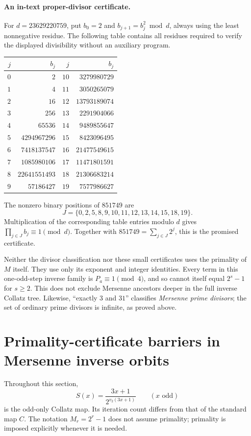 \documentclass[11pt,a4paper]{article}
\theoremstyle{definition}
\theoremstyle{remark}
\numberwithin{equation}{section}
\begin{document}
\paragraph{An in-text proper-divisor certificate.}
For $d=23629220759$, put $b_0=2$ and
$b_{j+1}=b_j^2\bmod d$, always using the least nonnegative residue.
The following table contains all residues required to verify the
displayed divisibility without an auxiliary program.
\begin{center}\small
\begin{tabular}{rrrr}
\toprule
$j$ & $b_j$ & $j$ & $b_j$\\\midrule
$0$&$2$&$10$&$3279980729$\\
$1$&$4$&$11$&$3050265079$\\
$2$&$16$&$12$&$13793189074$\\
$3$&$256$&$13$&$2291904066$\\
$4$&$65536$&$14$&$9489855647$\\
$5$&$4294967296$&$15$&$8423096495$\\
$6$&$7418137547$&$16$&$21477549615$\\
$7$&$1085980106$&$17$&$11471801591$\\
$8$&$22641551493$&$18$&$21306683214$\\
$9$&$57186427$&$19$&$7577986627$\\
\bottomrule
\end{tabular}
\end{center}
The nonzero binary positions of $851749$ are
\[
 J=\{0,2,5,8,9,10,11,12,13,14,15,18,19\}.
\]
Multiplication of the corresponding table entries modulo $d$ gives
$\prod_{j\in J}b_j\equiv1\pmod d$. Together with
$851749=\sum_{j\in J}2^j$, this is the promised certificate.

Neither the divisor classification nor these small certificates uses
the primality of $M$ itself. They use only its exponent and integer
identities. Every term in this one-odd-step inverse family is
$P_a\equiv1\pmod4$, and so cannot itself equal $2^s-1$ for $s\ge2$.
This does not exclude Mersenne ancestors deeper in the full inverse
Collatz tree. Likewise, ``exactly $3$ and $31$'' classifies
\emph{Mersenne prime divisors}; the set of ordinary prime divisors is
infinite, as proved above.



\section{Primality-certificate barriers in Mersenne inverse orbits}
\label{A:sec:mersenne-certificates}
Throughout this section,
\[
 S(x)=\frac{3x+1}{2^{v_2(3x+1)}}\qquad(x\text{ odd})
\]
is the odd-only Collatz map. Its iteration count differs from that of the
standard map $C$. The notation $M_r=2^r-1$ does not assume primality;
primality is imposed explicitly whenever it is needed.
\end{document}
